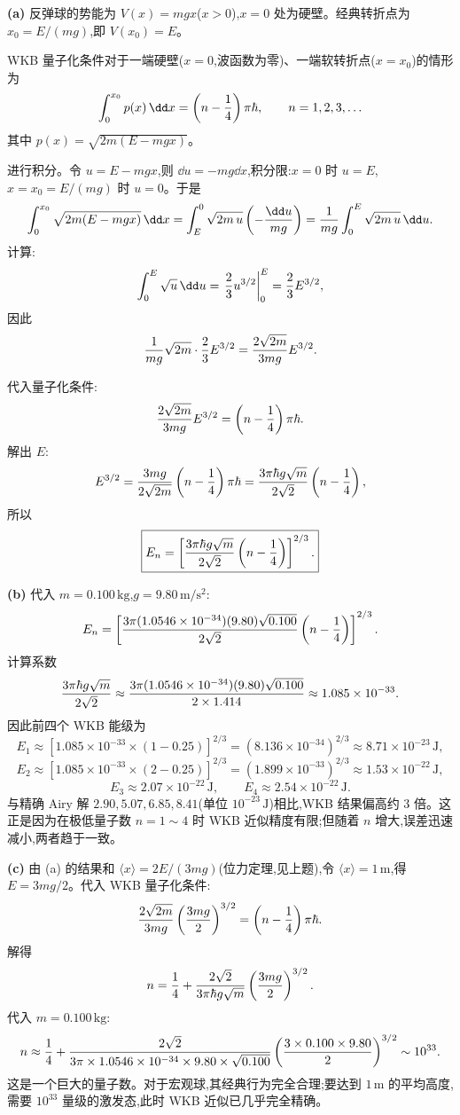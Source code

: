 \begin{solution}
\textbf{(a)} 反弹球的势能为 $V(x)=mgx$($x>0$),$x=0$ 处为硬壁。经典转折点为 $x_0=E/(mg)$,即 $V(x_0)=E$。

WKB 量子化条件对于一端硬壁($x=0$,波函数为零)、一端软转折点($x=x_0$)的情形为
\[
\int_0^{x_0}p(x)\,\dd x=\left(n-{1\over4}\right)\pi\hbar,
\qquad n=1,2,3,\ldots
\]
其中 $p(x)=\sqrt{2m(E-mgx)}$。

进行积分。令 $u=E-mgx$,则 $\dd u=-mg\dd x$,积分限:$x=0$ 时 $u=E$,$x=x_0=E/(mg)$ 时 $u=0$。于是
\[
\int_0^{x_0}\sqrt{2m(E-mgx)}\,\dd x
=\int_E^0\sqrt{2m\,u}\left(-{\dd u\over mg}\right)
={1\over mg}\int_0^E\sqrt{2m\,u}\,\dd u.
\]
计算:
\[
\int_0^E\sqrt{u}\,\dd u=\left.{2\over3}u^{3/2}\right|_0^E={2\over3}E^{3/2},
\]
因此
\[
{1\over mg}\sqrt{2m}\cdot{2\over3}E^{3/2}
={2\sqrt{2m}\over3mg}E^{3/2}.
\]

代入量子化条件:
\[
{2\sqrt{2m}\over3mg}E^{3/2}=\left(n-{1\over4}\right)\pi\hbar.
\]
解出 $E$:
\[
E^{3/2}={3mg\over2\sqrt{2m}}\left(n-{1\over4}\right)\pi\hbar
={3\pi\hbar g\sqrt m\over2\sqrt2}\left(n-{1\over4}\right),
\]
所以
\[
\boxed{E_n=\left[{3\pi\hbar g\sqrt m\over2\sqrt2}\left(n-{1\over4}\right)\right]^{2/3}.}
\]

\textbf{(b)} 代入 $m=0.100\,\mathrm{kg}$,$g=9.80\,\mathrm{m/s^2}$:
\[
E_n=\left[{3\pi(1.0546\times10^{-34})(9.80)\sqrt{0.100}\over2\sqrt2}
\left(n-{1\over4}\right)\right]^{2/3}.
\]
计算系数
\[
{3\pi\hbar g\sqrt m\over2\sqrt2}
\approx{3\pi(1.0546\times10^{-34})(9.80)\sqrt{0.100}\over2\times1.414}
\approx 1.085\times10^{-33}.
\]
因此前四个 WKB 能级为
\[
E_1\approx\left[1.085\times10^{-33}\times(1-0.25)\right]^{2/3}
=\left(8.136\times10^{-34}\right)^{2/3}\approx 8.71\times10^{-23}\,\mathrm{J},
\]
\[
E_2\approx\left[1.085\times10^{-33}\times(2-0.25)\right]^{2/3}
=\left(1.899\times10^{-33}\right)^{2/3}\approx 1.53\times10^{-22}\,\mathrm{J},
\]
\[
E_3\approx 2.07\times10^{-22}\,\mathrm{J},\qquad
E_4\approx 2.54\times10^{-22}\,\mathrm{J}.
\]
与精确 Airy 解 $2.90,5.07,6.85,8.41$(单位 $10^{-23}\,\mathrm{J}$)相比,WKB 结果偏高约 $3$ 倍。这正是因为在极低量子数 $n=1\sim4$ 时 WKB 近似精度有限;但随着 $n$ 增大,误差迅速减小,两者趋于一致。

\textbf{(c)} 由 (a) 的结果和 $\langle x\rangle=2E/(3mg)$(位力定理,见上题),令 $\langle x\rangle=1\,\mathrm{m}$,得 $E=3mg/2$。代入 WKB 量子化条件:
\[
{2\sqrt{2m}\over3mg}\left({3mg\over2}\right)^{3/2}
=\left(n-{1\over4}\right)\pi\hbar.
\]
解得
\[
n={1\over4}+{2\sqrt{2}\over3\pi\hbar g\sqrt m}\left({3mg\over2}\right)^{3/2}.
\]
代入 $m=0.100\,\mathrm{kg}$:
\[
n\approx{1\over4}+{2\sqrt2\over3\pi\times1.0546\times10^{-34}\times9.80\times\sqrt{0.100}}
\left({3\times0.100\times9.80\over2}\right)^{3/2}\sim 10^{33}.
\]
这是一个巨大的量子数。对于宏观球,其经典行为完全合理;要达到 $1\,\mathrm{m}$ 的平均高度,需要 $10^{33}$ 量级的激发态,此时 WKB 近似已几乎完全精确。
\end{solution}

